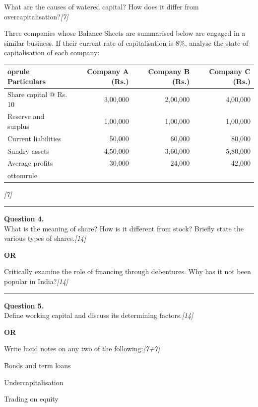 \documentclass[11pt,a4paper]{article}
\newcommand{\pts}[1]{\hfill   \textit{[#1]}}
\begin{document}
\begin{parts}
  \item What are the causes of watered capital? How does it differ from overcapitalisation?\pts{7}
  \item Three companies whose Balance Sheets are summarised below are engaged in a similar business. If their current rate of capitalisation is 8\%, analyse the state of capitalisation of each company:
  
  
\begin{center}
    \small
    
\begin{tabular}{lrrr}
       oprule
   \textbf{Particulars} &   \textbf{Company A (Rs.)} &   \textbf{Company B (Rs.)} &   \textbf{Company C (Rs.)} \\
      \midrule
      Share capital @ Rs. 10 & 3,00,000 & 2,00,000 & 4,00,000 \\
      Reserve and surplus & 1,00,000 & 1,00,000 & 1,00,000 \\
      Current liabilities & 50,000 & 60,000 & 80,000 \\
      Sundry assets & 4,50,000 & 3,60,000 & 5,80,000 \\
      Average profits & 30,000 & 24,000 & 42,000 \\
      ottomrule
    \end{tabular}
  \end{center}\pts{7}
\end{parts}

\medskip\rule{\linewidth}{0.2pt}




\noindent   \textbf{Question 4.} \\
What is the meaning of share? How is it different from stock? Briefly state the various types of shares.\pts{14}

\centerline{   \textbf{OR}}

Critically examine the role of financing through debentures. Why has it not been popular in India?\pts{14}

\medskip\rule{\linewidth}{0.2pt}




\noindent   \textbf{Question 5.} \\
Define working capital and discuss its determining factors.\pts{14}

\centerline{   \textbf{OR}}

Write lucid notes on any two of the following:\pts{7+7}

\begin{parts}
  \item Bonds and term loans
  \item Undercapitalisation
  \item Trading on equity
\end{parts}
\end{document}
